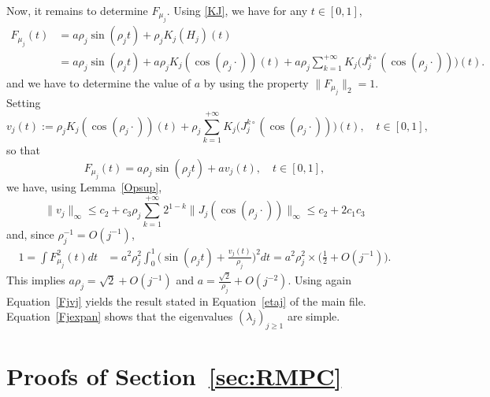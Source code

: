 \documentclass[aos]{imsart}
\theoremstyle{plain}
\theoremstyle{remark}
\newcommand{\1}{1}
\begin{document}
Now, it remains to determine $F_{\mu_j}$. Using \eqref{KJ}, we have for any $t\in [0,1]$,
\begin{align*}
F_{\mu_j}(t)&=a\rho_j\sin (\rho_j t)+\rho_jK_j(H_j)(t)\\
&=a\rho_j\sin (\rho_j t)+a\rho_jK_j(\cos(\rho_j\cdot))(t)+a\rho_j\sum_{k=1}^{+\infty}K_j\big(J_j^{k\circ}(\cos(\rho_j\cdot))\big)(t).
\end{align*}
and we have to determine the value of $a$ by using the property $\|F_{\mu_j}\|_2=1$. Setting 
\[
v_j(t):=\rho_jK_j(\cos(\rho_j\cdot))(t)+\rho_j\sum_{k=1}^{+\infty}K_j\big(J_j^{k\circ}(\cos(\rho_j\cdot))\big)(t),\quad t\in[0,1],
\]
so that
\begin{equation}\label{Fjvj}
F_{\mu_j}(t)=a\rho_j\sin (\rho_j t)+av_j(t),\quad t\in[0,1],
\end{equation}
we have, using Lemma~\ref{Opsup},
\[
\|v_j\|_{\infty}\leq c_2+c_3\rho_j\sum_{k=1}^{+\infty}2^{1-k}\|J_j(\cos(\rho_j\cdot))\|_{\infty}\leq c_2+2c_1c_3
\]
and, since $\rho_j^{-1}= O(j^{-1})$,
\begin{align*}
1=\int F^2_{\mu_j}(t)dt&=a^2\rho_j^2\int_0^1\Big(\sin(\rho_j t)+\frac{v_j(t)}{\rho_j}\Big)^2dt=a^2\rho_j^2\times\Big(\frac{1}{2}+O(j^{-1})\Big).
\end{align*}
This implies $a\rho_j=\sqrt{2}+O(j^{-1})$ and $a=\frac{\sqrt{2}}{\rho_j}+O(j^{-2})$.
Using again Equation~\eqref{Fjvj} yields the result stated in Equation~\eqref{etaj} of the main file. Equation~\eqref{Fjexpan} shows that the eigenvalues $(\lambda_j)_{j\geq 1} $ are simple.
\section{Proofs of Section~\ref{sec:RMPC}}\label{sec:proof:op}
\end{document}
